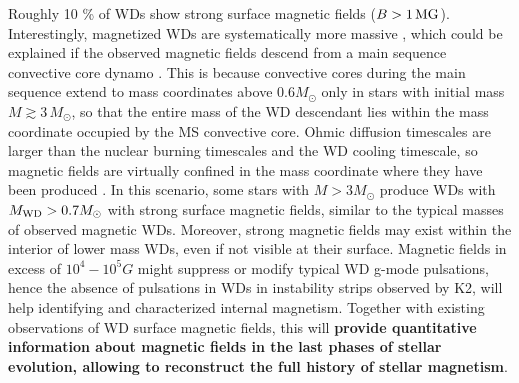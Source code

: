 
Roughly 10 \% of WDs show strong surface magnetic fields ($B > 1 \, {\rm MG}$).
Interestingly, magnetized WDs are systematically more massive \cite{Ferrario_2015}, which could be explained if the observed magnetic fields descend from a main sequence convective core dynamo \cite{Cantiello_2016}. This is because convective cores during the main sequence extend to mass coordinates above 0.6$M_\odot$ only in stars with initial mass $M \gtrsim 3 \, M_\odot$, so that the entire mass of the WD descendant lies within the mass coordinate occupied by the MS convective core. Ohmic diffusion timescales are larger than the nuclear burning timescales and the WD cooling timescale, so magnetic fields are virtually confined in the mass coordinate where they have been produced \cite{Cantiello_2016}. In this scenario, some stars with $M>3M_\odot$ produce WDs with $M_{\rm WD}>0.7M_\odot$ with strong surface magnetic fields, similar to the typical masses of observed magnetic WDs. Moreover, strong magnetic fields may exist within the interior of lower mass WDs, even if not visible at their surface. Magnetic fields in excess of $10^4-10^5 G$ might suppress or modify typical WD g-mode pulsations, hence the absence of pulsations in WDs in instability strips observed by K2, will help identifying and characterized internal magnetism. Together with existing observations of WD surface magnetic fields, this will \textbf{provide quantitative information about magnetic fields in the last phases of stellar evolution, allowing to reconstruct the full history of stellar magnetism}.